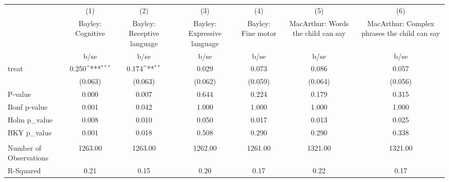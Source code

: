 {
\def\sym#1{\ifmmode^{#1}\else\(^{#1}\)\fi}
\begin{tabular}{l*{6}{c}}
\hline\hline
                    &\multicolumn{1}{c}{(1)}&\multicolumn{1}{c}{(2)}&\multicolumn{1}{c}{(3)}&\multicolumn{1}{c}{(4)}&\multicolumn{1}{c}{(5)}&\multicolumn{1}{c}{(6)}\\
                    &\multicolumn{1}{c}{Bayley: Cognitive}&\multicolumn{1}{c}{Bayley: Receptive language}&\multicolumn{1}{c}{Bayley: Expressive language}&\multicolumn{1}{c}{Bayley: Fine motor}&\multicolumn{1}{c}{MacArthur: Words the child can say}&\multicolumn{1}{c}{MacArthur: Complex phrases the child can say}\\
                    &        b/se         &        b/se         &        b/se         &        b/se         &        b/se         &        b/se         \\
\hline
treat               &       0.250\sym{***}&       0.174\sym{**} &       0.029         &       0.073         &       0.086         &       0.057         \\
                    &     (0.063)         &     (0.063)         &     (0.062)         &     (0.059)         &     (0.064)         &     (0.056)         \\
\hline
P-value             &       0.000         &       0.007         &       0.644         &       0.224         &       0.179         &       0.315         \\
Bonf p-value        &       0.001         &       0.042         &       1.000         &       1.000         &       1.000         &       1.000         \\
Holm p\_value        &       0.008         &       0.010         &       0.050         &       0.017         &       0.013         &       0.025         \\
BKY p\_value         &       0.001         &       0.018         &       0.508         &       0.290         &       0.290         &       0.338         \\
                    &                     &                     &                     &                     &                     &                     \\
Number of Observations&     1263.00         &     1263.00         &     1262.00         &     1261.00         &     1321.00         &     1321.00         \\
R-Squared           &        0.21         &        0.15         &        0.20         &        0.17         &        0.22         &        0.17         \\
\hline\hline
\end{tabular}
}
